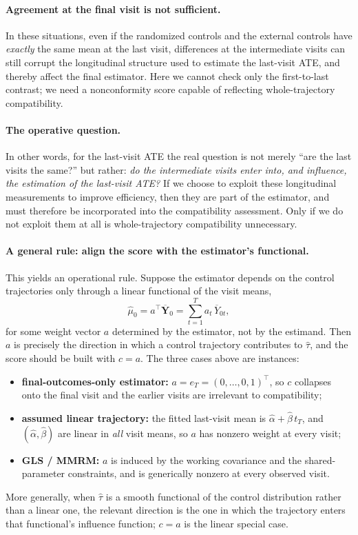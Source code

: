 \documentclass[11pt]{article}
\begin{document}
\paragraph{Agreement at the final visit is not sufficient.}
In these situations, even if the randomized controls and the external controls have \emph{exactly} the same mean at the last visit, differences at the intermediate visits can still corrupt the longitudinal structure used to estimate the last-visit ATE, and thereby affect the final estimator. Here we cannot check only the first-to-last contrast; we need a nonconformity score capable of reflecting whole-trajectory compatibility.

\paragraph{The operative question.}
In other words, for the last-visit ATE the real question is not merely ``are the last visits the same?'' but rather: \emph{do the intermediate visits enter into, and influence, the estimation of the last-visit ATE?} If we choose to exploit these longitudinal measurements to improve efficiency, then they are part of the estimator, and must therefore be incorporated into the compatibility assessment. Only if we do not exploit them at all is whole-trajectory compatibility unnecessary.

\paragraph{A general rule: align the score with the estimator's functional.}
This yields an operational rule. Suppose the estimator depends on the control trajectories only through a linear functional of the visit means,
\[
\widehat\mu_0=a^{\top}\overline{\bm Y}_0
=\sum_{t=1}^{T}a_t\,\overline{Y}_{0t},
\]
for some weight vector $a$ determined by the estimator, not by the estimand. Then $a$ is precisely the direction in which a control trajectory contributes to $\widehat\tau$, and the score should be built with $c=a$. The three cases above are instances:
\begin{itemize}[leftmargin=*,itemsep=2pt,topsep=3pt]
\item \textbf{final-outcomes-only estimator:} $a=e_T=(0,\dots,0,1)^{\top}$, so $c$ collapses onto the final visit and the earlier visits are irrelevant to compatibility;
\item \textbf{assumed linear trajectory:} the fitted last-visit mean is $\widehat\alpha+\widehat\beta\,t_T$, and $(\widehat\alpha,\widehat\beta)$ are linear in \emph{all} visit means, so $a$ has nonzero weight at every visit;
\item \textbf{GLS / MMRM:} $a$ is induced by the working covariance and the shared-parameter constraints, and is generically nonzero at every observed visit.
\end{itemize}
More generally, when $\widehat\tau$ is a smooth functional of the control distribution rather than a linear one, the relevant direction is the one in which the trajectory enters that functional's influence function; $c=a$ is the linear special case.
\end{document}
